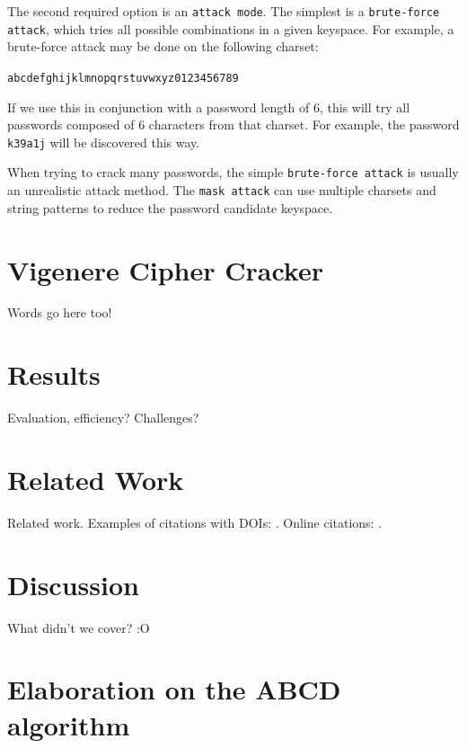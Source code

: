 \documentclass[acmlarge]{acmart}
\begin{document}
The second required option is an \texttt{attack mode}. The simplest is a \texttt{brute-force attack}, which tries all possible combinations in a given keyspace. For example, a brute-force attack may be done on the following charset:

\begin{center}
\texttt{abcdefghijklmnopqrstuvwxyz0123456789}	
\end{center}

If we use this in conjunction with a password length of $6$, this will try all passwords composed of $6$ characters from that charset. For example, the password \texttt{k39a1j} will be discovered this way.

When trying to crack many passwords, the simple \texttt{brute-force attack} is usually an unrealistic attack method. The \texttt{mask attack} can use multiple charsets and string patterns to reduce the password candidate keyspace. 

\section{Vigenere Cipher Cracker}\label{sec:vinegar}

Words go here too!

\section{Results}\label{sec:results}

Evaluation, efficiency? Challenges?

\section{Related Work}\label{sec:relatedwork}

Related work. Examples of citations with DOIs: \cite{2004:ITE:1009386.1010128, Kirschmer:2010:AEI:1958016.1958018}. Online citations: \cite{TUGInstmem, Thornburg01, CTANacmart}.

\section{Discussion}\label{sec:discussion}

What didn't we cover? :O

\appendix
\section{Elaboration on the ABCD algorithm}
\end{document}
